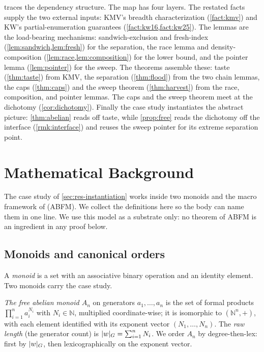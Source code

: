 \documentclass[11pt]{article}
\numberwithin{equation}{section}
\newcommand{\N}{\mathbb{N}}
\DeclarePairedDelimiter{\abs}{\lvert}{\rvert}
\theoremstyle{plain}
\theoremstyle{definition}
\theoremstyle{remark}
\begin{document}
 traces the dependency structure. The map has four layers. The restated facts
supply the two external inputs: KMV's breadth characterization (\cref{fact:kmv}) and KW's
partial-enumeration guarantees (\cref{fact:kw16,fact:kw25}). The lemmas are the load-bearing
mechanisms: sandwich-exclusion and fresh-index (\cref{lem:sandwich,lem:fresh}) for the
separation, the race lemma and density-composition (\cref{lem:race,lem:composition}) for the
lower bound, and the pointer lemma (\cref{lem:pointer}) for the sweep. The theorems assemble
these: taste (\cref{thm:taste}) from KMV, the separation (\cref{thm:flood}) from the two chain
lemmas, the caps (\cref{thm:caps}) and the sweep theorem (\cref{thm:harvest}) from the race,
composition, and pointer lemmas. The caps and the sweep theorem meet at the dichotomy
(\cref{cor:dichotomy}). Finally the case study instantiates the abstract picture:
\cref{thm:abelian} reads off taste, while \cref{prop:free} reads the dichotomy off the
interface (\cref{rmk:interface}) and reuses the sweep pointer for its extreme separation
point.

\section{Mathematical Background}
\label{app:background}

The case study of \cref{sec:res-instantiation} works inside two monoids and the macro
framework of \citet{aksenov2026compression} (ABFM). We collect the definitions here so the
body can name them in one line. We use this model as a substrate only: no theorem of ABFM is
an ingredient in any proof below.

\subsection{Monoids and canonical orders}
\label{app:bg-monoids}

A \emph{monoid} is a set with an associative binary operation and an identity element. Two
monoids carry the case study.

\emph{The free abelian monoid $A_n$} on generators $a_1, \dots, a_n$ is the set of formal
products $\prod_{i=1}^n a_i^{N_i}$ with $N_i \in \N$, multiplied coordinate-wise; it is
isomorphic to $(\N^n, +)$, with each element identified with its exponent vector $(N_1, \dots,
N_n)$. The \emph{raw length} (the generator count) is $\abs{w}_G = \sum_{i=1}^n N_i$. We order
$A_n$ by degree-then-lex: first by $\abs{w}_G$, then lexicographically on the exponent vector.
\end{document}
